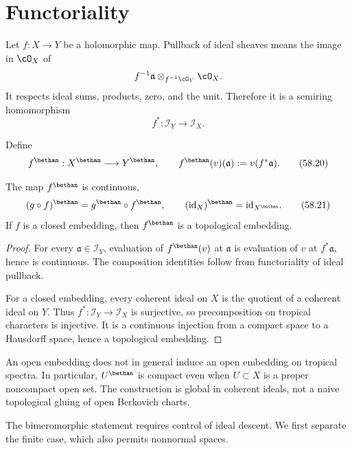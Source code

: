 \section{Functoriality}
\label{sec:ts-functoriality}

Let $f:X\to Y$ be a holomorphic map.
Pullback of ideal sheaves means the image in $\cO_X$ of
\[
                    f^{-1}\mathfrak a\otimes_{f^{-1}\cO_Y}\cO_X.
\]
It respects ideal sums, products, zero, and the unit.
Therefore it is a semiring homomorphism
\[
                         f^*:\mathscr I_Y\longrightarrow\mathscr I_X.
\]

\begin{definition}
\label{def:ts-functorial-map}
Define
\[
 f^\bethan:X^\bethan\longrightarrow Y^\bethan,
 \qquad
 f^\bethan(v)(\mathfrak a):=v(f^*\mathfrak a).
\tag{58.20}\label{eq:ts-functorial-map}
\]
\end{definition}

\begin{proposition}\label{prop:ts-functoriality}
The map $f^\bethan$ is continuous,
\[
 (g\circ f)^\bethan=g^\bethan\circ f^\bethan,
 \qquad
 (\mathrm{id}_X)^\bethan=\mathrm{id}_{X^\bethan}.
\tag{58.21}\label{eq:ts-functoriality}
\]
If $f$ is a closed embedding, then $f^\bethan$ is a topological
embedding.
\end{proposition}

\begin{proof}
For every $\mathfrak a\in\mathscr I_Y$, evaluation of
$f^\bethan(v)$ at $\mathfrak a$ is evaluation of $v$ at
$f^*\mathfrak a$, hence is continuous.
The composition identities follow from functoriality of ideal pullback.

For a closed embedding, every coherent ideal on $X$ is the quotient of a
coherent ideal on $Y$.
Thus $f^*:\mathscr I_Y\to\mathscr I_X$ is surjective, so precomposition on
tropical characters is injective.
It is a continuous injection from a compact space to a Hausdorff space,
hence a topological embedding.
\end{proof}

An open embedding does not in general induce an open embedding on tropical
spectra.
In particular, $U^\bethan$ is compact even when $U\subset X$ is a
proper noncompact open set.
The construction is global in coherent ideals, not a naive topological
gluing of open Berkovich charts.

The bimeromorphic statement requires control of ideal descent. We first
separate the finite case, which also permits nonnormal spaces.

